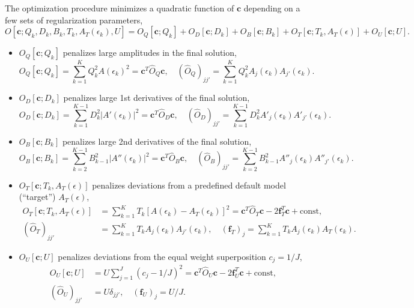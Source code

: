 \documentclass[]{article}
\begin{document}
The optimization procedure minimizes a quadratic function of $\mathbf{c}$ depending on a few sets of regularization parameters,
\begin{equation}
    O[\mathbf{c}; Q_k, D_k, B_k, T_k, A_T(\epsilon_k), U] =
        O_Q[\mathbf{c}; Q_k] +
        O_D[\mathbf{c}; D_k] +
        O_B[\mathbf{c}; B_k] +
        O_T[\mathbf{c}; T_k, A_T(\epsilon)] +
        O_U[\mathbf{c}; U].
\end{equation}
\begin{itemize}
    \item $O_Q[\mathbf{c}; Q_k]$ penalizes large amplitudes in the final solution,
    \begin{equation}
        O_Q[\mathbf{c}; Q_k] = \sum_{k=1}^K Q_k^2 A(\epsilon_k)^2 =
        \mathbf{c}^T \hat O_Q \mathbf{c}, \quad
        (\hat O_Q)_{jj'} = \sum_{k=1}^K Q_k^2 A_j(\epsilon_k) A_{j'}(\epsilon_k).
    \end{equation}

    \item $O_D[\mathbf{c}; D_k]$ penalizes large 1st derivatives of the final solution,
    \begin{equation}
        O_D[\mathbf{c}; D_k] = \sum_{k=1}^{K-1} D_k^2 |A'(\epsilon_k)|^2 =
        \mathbf{c}^T \hat O_D \mathbf{c}, \quad
        (\hat O_D)_{jj'} = \sum_{k=1}^{K-1} D_k^2 A'_j(\epsilon_k) A'_{j'}(\epsilon_k).
    \end{equation}

    \item $O_B[\mathbf{c}; B_k]$ penalizes large 2nd derivatives of the final solution,
    \begin{equation}
        O_B[\mathbf{c}; B_k] = \sum_{k=2}^{K-1} B_{k-1}^2 |A''(\epsilon_k)|^2 =
        \mathbf{c}^T \hat O_B \mathbf{c}, \quad
        (\hat O_B)_{jj'} = \sum_{k=2}^{K-1} B_{k-1}^2 A''_j(\epsilon_k) A''_{j'}(\epsilon_k).
    \end{equation}

    \item $O_T[\mathbf{c}; T_k, A_T(\epsilon)]$ penalizes deviations from a predefined default model (``target'') $A_T(\epsilon)$,
    \begin{align}
        O_T[\mathbf{c}; T_k, A_T(\epsilon)] &= \sum_{k=1}^K T_k
            [A(\epsilon_k) - A_T(\epsilon_k)]^2 =
            \mathbf{c}^T \hat O_T \mathbf{c} - 2\mathbf{f}_T^T \mathbf{c} + \mathrm{const},\\
        (\hat O_T)_{jj'} &= \sum_{k=1}^K T_k A_j(\epsilon_k) A_{j'}(\epsilon_k),
        \quad
        (\mathbf{f}_T)_j = \sum_{k=1}^K T_k A_j(\epsilon_k) A_T(\epsilon_k).
    \end{align}

    \item $O_U[\mathbf{c}; U]$ penalizes deviations from the equal weight superposition $c_j = 1/J$,
    \begin{align}
        O_U[\mathbf{c}; U] &= U \sum_{j=1}^J (c_j - 1/J)^2 =
        \mathbf{c}^T \hat O_U \mathbf{c} - 2\mathbf{f}_U^T \mathbf{c} + \mathrm{const},\\
        (\hat O_U)_{jj'} &= U \delta_{jj'},\quad
        (\mathbf{f}_U)_j = U / J.
\end{align}
\end{itemize}
\end{document}
